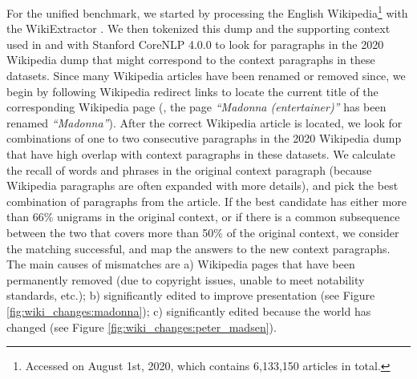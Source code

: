 For the unified benchmark, we started by processing the English Wikipedia\footnote{Accessed on August 1st, 2020, which contains 6,133,150 articles in total.} with the WikiExtractor \citep{attardi2015wikiextractor}.
We then tokenized this dump and the supporting context used in \squad{} and \hotpotqa{} with Stanford CoreNLP 4.0.0 \citep{manning-EtAl:2014:P14-5} to look for paragraphs in the 2020 Wikipedia dump that might correspond to the context paragraphs in these datasets.
Since many Wikipedia articles have been renamed or removed since, we begin by following Wikipedia redirect links to locate the current title of the corresponding Wikipedia page (\eg, the page \emph{``Madonna (entertainer)''} has been renamed \emph{``Madonna''}).
After the correct Wikipedia article is located, we look for combinations of one to two consecutive paragraphs in the 2020 Wikipedia dump that have high overlap with context paragraphs in these datasets.
We calculate the recall of words and phrases in the original context paragraph (because Wikipedia paragraphs are often expanded with more details), and pick the best combination of paragraphs from the article.
If the best candidate has either more than 66\% unigrams in the original context, or if there is a common subsequence between the two that covers more than 50\% of the original context, we consider the matching successful, and map the answers to the new context paragraphs.
The main causes of mismatches are a) Wikipedia pages that have been permanently removed (due to copyright issues, unable to meet notability standards, etc.); b) significantly edited to improve presentation (see Figure \ref{fig:wiki_changes:madonna}); c) significantly edited because the world has changed (see Figure \ref{fig:wiki_changes:peter_madsen}).

